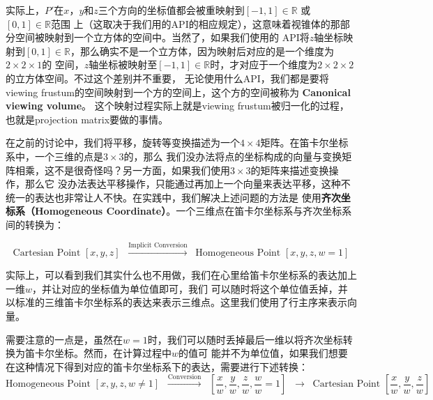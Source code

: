 \documentclass[12pt]{article}
\begin{document}
\indent{}实际上，$P'$在$x$，$y$和$z$三个方向的坐标值都会被重映射到$[-1,1]\in\mathbb{R}$ 或 $[0,1]\in\mathbb{R}$范围
上（这取决于我们用的API的相应规定），这意味着视锥体的那部分空间被映射到一个立方体的空间中。当然了，如果我们使用的
API将$z$轴坐标映射到$[0,1]\in\mathbb{R}$，那么确实不是一个立方体，因为映射后对应的是一个维度为$2\times 2\times 1$的
空间，$z$轴坐标被映射至$[-1,1]\in\mathbb{R}$时，才对应于一个维度为$2\times 2\times 2$的立方体空间。不过这个差别并不重要，
无论使用什么API，我们都是要将viewing frustum的空间映射到一个方的空间上，这个方的空间被称为 \textbf{Canonical viewing volume}。
这个映射过程实际上就是viewing frustum被归一化的过程，也就是projection matrix要做的事情。

\indent{}在之前的讨论中，我们将平移，旋转等变换描述为一个$4\times 4$矩阵。在笛卡尔坐标系中，一个三维的点是$3\times 3$的，那么
我们没办法将点的坐标构成的向量与变换矩阵相乘，这不是很奇怪吗？另一方面，如果我们使用$3\times 3$的矩阵来描述变换操作，那么它
没办法表达平移操作，只能通过再加上一个向量来表达平移，这种不统一的表达也非常让人不快。在实践中，我们解决上述问题的方法是
使用\textbf{齐次坐标系（Homogeneous Coordinate）}。一个三维点在笛卡尔坐标系与齐次坐标系间的转换为：

\begin{displaymath}
\textrm{Cartesian Point }[x, y, z] \;\; \overset{\textrm{Implicit Conversion}}{\longrightarrow} \;\;
\textrm{Homogeneous Point }[x, y, z, w=1]
\end{displaymath}

\indent{}实际上，可以看到我们其实什么也不用做，我们在心里给笛卡尔坐标系的表达加上一维$w$，并让对应的坐标值为单位值即可，我们
可以随时将这个单位值丢掉，并以标准的三维笛卡尔坐标系的表达来表示三维点。这里我们使用了行主序来表示向量。

\indent{}需要注意的一点是，虽然在$w=1$时，我们可以随时丢掉最后一维以将齐次坐标转换为笛卡尔坐标。然而，在计算过程中$w$的值可
能并不为单位值，如果我们想要在这种情况下得到对应的笛卡尔坐标系下的表达，需要进行下述转换：
\begin{displaymath}
\textrm{Homogeneous Point }[x, y, z, w\neq 1] \;\; \overset{\textrm{Conversion}}{\longrightarrow} \;\;
[\frac{x}{w},\frac{y}{w},\frac{z}{w},\frac{w}{w}=1]
\;\; \rightarrow \;\; \textrm{Cartesian Point }[\frac{x}{w},\frac{y}{w},\frac{z}{w}]
\end{displaymath}
\end{document}
